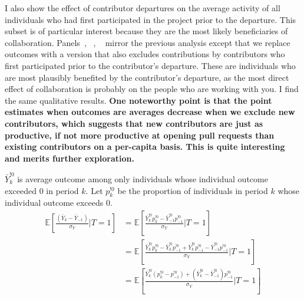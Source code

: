 \documentclass[12pt,notitlepage]{article}
\begin{document}
I also show the effect of contributor departures on the average activity of all individuals who had first participated in the project prior to the departure. This subset is of particular interest because they are the most likely beneficiaries of collaboration. 
Panels~, ~, ~ mirror the previous analysis except that we replace outcomes with a version that also excludes contributions by contributors who first participated prior to the contributor's departure. These are individuals who are most plausibly benefited by the contributor's departure, as the most direct effect of collaboration is probably on the people who are working with you. I find the same qualitative results. \textbf{One noteworthy point is that the point estimates when outcomes are averages decrease when we exclude new contributors, which suggests that new contributors are just as productive, if not more productive at opening pull requests than existing contributors on a per-capita basis. This is quite interesting and merits further exploration.}



$\bar Y_{k}^{!0} $ is average outcome among only individuals whose individual outcome exceeded 0 in period $k$. Let $p_k^{!0}$ be the proportion of individuals in period $k$ whose individual outcome exceeds 0. 
\begin{align*}
    \mathbb{E}\!\left[\frac{(\bar Y_k - \bar Y_{-1}) }{\sigma_Y} \Big| T=1\right] &= \mathbb{E}\!\left[\frac{ \bar Y_{k}^{!0}  p_k^{!0} - \bar Y_{-1}^{!0} p_{-1}^{!0} }{\sigma_Y} \Big| T=1\right] \\
    &=  \mathbb{E}\!\left[\frac{ \bar  Y_{k}^{!0}  p_k^{!0} - \bar  Y_{k}^{!0} p_{-1}^{!0} +\bar Y_{k}^{!0}  p_{-1}^{!0}  -\bar Y_{-1}^{!0}  p_{-1}^{!0} }{\sigma_Y} \Big| T=1\right] \\
    &=  \mathbb{E}\!\left[\frac{ \bar  Y_{k}^{!0} \left(p_k^{!0} -  p_{-1}^{!0}  \right) +  \left( \bar  Y_{k}^{!0}  - \bar Y_{-1}^{!0} \right)  p_{-1}^{!0}  }{\sigma_Y} \Big| T=1\right]
\end{align*}


\end{document}

